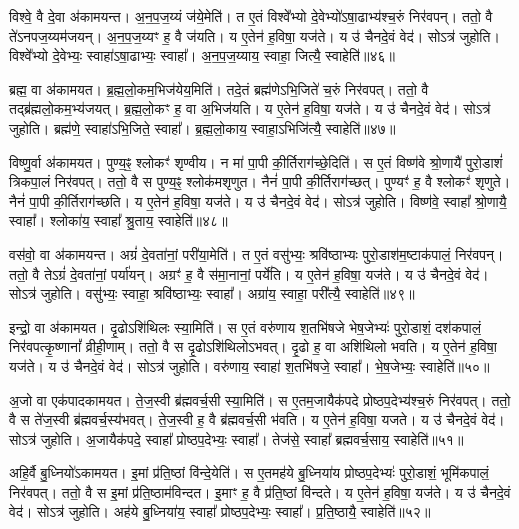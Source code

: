 विश्वे॒ वै दे॒वा अ॑कामयन्त।
अ॒न॒प॒ज॒य्यं ज॑ये॒मेति॑।
त ए॒तं विश्वे᳚भ्यो दे॒वेभ्यो॑\-ऽषा॒ढाभ्य॑श्च॒रुं निर॑वपन्।
ततो॒ वै ते॑\-ऽनपज॒य्यम॑जयन्।
अ॒न॒प॒ज॒य्यꣳ ह॒ वै ज॑यति।
य ए॒तेन॑ ह॒विषा॒ यज॑ते।
य उ॑ चैनदे॒वं वेद॑।
सोऽत्र॑ जुहोति।
विश्वे᳚भ्यो दे॒वेभ्यः॒ स्वाहा॑\-ऽषा॒ढाभ्यः॒ स्वाहा᳚।
अ॒न॒प॒ज॒य्याय॒ स्वाहा॒ जित्यै॒ स्वाहेति॑॥४६॥\ip

ब्रह्म॒ वा अ॑कामयत।
ब्र॒ह्म॒लो॒कम॒भिज॑येय॒मिति॑।
तदे॒तं ब्रह्म॑णे\-ऽभि॒जिते॑ च॒रुं निर॑वपत्।
ततो॒ वै तद्ब्र॑ह्मलो॒कम॒भ्य॑जयत्।
ब्र॒ह्म॒लो॒कꣳ ह॒ वा अ॒भि\-ज॑यति।
य ए॒तेन॑ ह॒विषा॒ यज॑ते।
य उ॑ चैनदे॒वं वेद॑।
सोऽत्र॑ जुहोति।
ब्रह्म॑णे॒ स्वाहा॑\-ऽभि॒जिते॒ स्वाहा᳚।
ब्र॒ह्म॒लो॒काय॒ स्वाहा॒\-ऽभिजि॑त्यै॒ स्वाहेति॑॥४७॥\ip

विष्णु॒र्वा अ॑कामयत।
पुण्य॒ꣴ॒ श्लोकꣳ॑ शृण्वीय।
न मा॑ पा॒पी की॒र्तिराग॑च्छे॒दिति॑।
स ए॒तं विष्ण॑वे श्रो॒णायै॑ पुरो॒डाशं॑ त्रिकपा॒लं निर॑वपत्।
ततो॒ वै स पुण्य॒ꣴ॒ श्लोक॑मशृणुत।
नैनं॑ पा॒पी की॒र्तिराग॑च्छत्।
पुण्यꣳ॑ ह॒ वै श्लोकꣳ॑ शृणुते।
नैनं॑ पा॒पी की॒र्तिराग॑च्छति।
य ए॒तेन॑ ह॒विषा॒ यज॑ते।
य उ॑ चैनदे॒वं वेद॑।
सोऽत्र॑ जुहोति।
विष्ण॑वे॒ स्वाहा᳚ श्रो॒णायै॒ स्वाहा᳚।
श्लोका॑य॒ स्वाहा᳚ श्रु॒ताय॒ स्वाहेति॑॥४८॥\ip

वस॑वो॒ वा अ॑कामयन्त।
अग्रं॑ दे॒वता॑नां॒ परी॑या॒मेति॑।
त ए॒तं वसु॑भ्यः॒ श्रवि॑ष्ठाभ्यः पुरो॒डाश॑म॒ष्टा\-क॑पालं॒ निर॑वपन्।
ततो॒ वै तेऽग्रं॑ दे॒वता॑नां॒ पर्या॑यन्।
अग्रꣳ॑ ह॒ वै स॑मा॒नानां॒ पर्ये॑ति।
य ए॒तेन॑ ह॒विषा॒ यज॑ते।
य उ॑ चैनदे॒वं वेद॑।
सोऽत्र॑ जुहोति।
वसु॑भ्यः॒ स्वाहा॒ श्रवि॑ष्ठाभ्यः॒ स्वाहा᳚।
अग्रा॑य॒ स्वाहा॒ परी᳚त्यै॒ स्वाहेति॑॥४९॥\ip

इन्द्रो॒ वा अ॑कामयत।
दृ॒ढो\-ऽशि॑थिलः स्या॒मिति॑।
स ए॒तं वरु॑णाय श॒तभि॑षजे भेष॒जेभ्यः॑ पुरो॒डाशं॒ दश॑कपालं॒ निर॑वपत्कृ॒ष्णानां᳚ व्रीही॒णाम्।
ततो॒ वै स दृ॒ढो\-ऽशि॑थिलो\-ऽभवत्।
दृ॒ढो ह॒ वा अशि॑थिलो भवति।
य ए॒तेन॑ ह॒विषा॒ यज॑ते।
य उ॑ चैनदे॒वं वेद॑।
सोऽत्र॑ जुहोति।
वरु॑णाय॒ स्वाहा॑ श॒तभि॑षजे॒ स्वाहा᳚।
भे॒ष॒जेभ्यः॒ स्वाहेति॑॥५०॥\ip

अ॒जो वा एक॑पादकामयत।
ते॒ज॒स्वी ब्र॑ह्म\-वर्च॒सी स्या॒मिति॑।
स ए॒तम॒जायैक॑पदे प्रोष्ठप॒देभ्य॑श्च॒रुं निर॑वपत्।
ततो॒ वै स ते॑ज॒स्वी ब्र॑ह्म\-वर्च॒स्य॑भवत्।
ते॒ज॒स्वी ह॒ वै ब्र॑ह्म\-वर्च॒सी भ॑वति।
य ए॒तेन॑ ह॒विषा॒ यजते।
य उ॑ चैनदे॒वं वेद॑।
सोऽत्र॑ जुहोति।
अ॒जायैक॑पदे॒ स्वाहा᳚ प्रोष्ठप॒देभ्यः॒ स्वाहा᳚।
तेज॑से॒ स्वाहा᳚ ब्रह्मवर्च॒साय॒ स्वाहेति॑॥५१॥\ip

अहि॒र्वै बु॒ध्नियो॑\-ऽकामयत।
इ॒मां प्र॑ति॒ष्ठां वि॑न्दे॒येति॑।
स ए॒तमह॑ये बु॒ध्निया॑य प्रोष्ठप॒देभ्यः॑ पुरो॒डाशं॒ भूमि॑कपालं॒ निर॑वपत्।
ततो॒ वै स इ॒मां प्र॑ति॒ष्ठाम॑विन्दत।
इ॒माꣳ ह॒ वै प्र॑ति॒ष्ठां वि॑न्दते।
य ए॒तेन॑ ह॒विषा॒ यज॑ते।
य उ॑ चैनदे॒वं वेद॑।
सोऽत्र॑ जुहोति।
अह॑ये बु॒ध्निया॑य॒ स्वाहा᳚ प्रोष्ठप॒देभ्यः॒ स्वाहा᳚।
प्र॒ति॒ष्ठायै॒ स्वाहेति॑॥५२॥\ip

